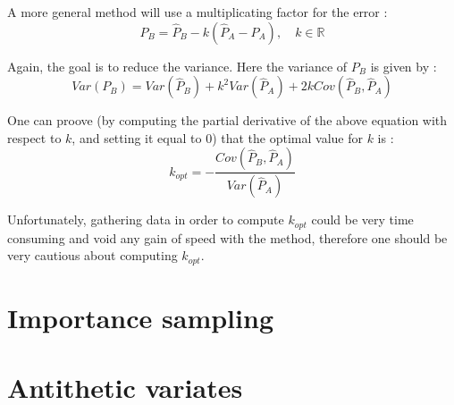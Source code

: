 \documentclass[hidelinks]{article}
\begin{document}
A more general method will use a multiplicating factor for the error :
$$P_B=\hat{P}_B - k(\hat{P}_A - P_A), \quad k \in \mathbb{R}$$

Again, the goal is to reduce the variance. Here the variance of $P_B$ is given by :
$$Var(P_B)=Var(\hat{P}_B)+k^2 Var(\hat{P}_A) + 2kCov(\hat{P}_B,\hat{P}_A)$$

One can proove (by computing the partial derivative of the above equation with respect to $k$, and setting it equal to $0$) that the optimal value for $k$ is :
$$k_{opt} = -\frac{Cov(\hat{P}_B,\hat{P}_A)}{Var(\hat{P}_A)}$$

Unfortunately, gathering data in order to compute $k_{opt}$ could be very time consuming and void any gain of speed with the method, therefore one should be very cautious about computing $k_{opt}$.
\newpage
\section{Importance sampling}

\newpage
\appendix
    \section{Antithetic variates}
    \label{sec:antithetic}
    
\end{document}

